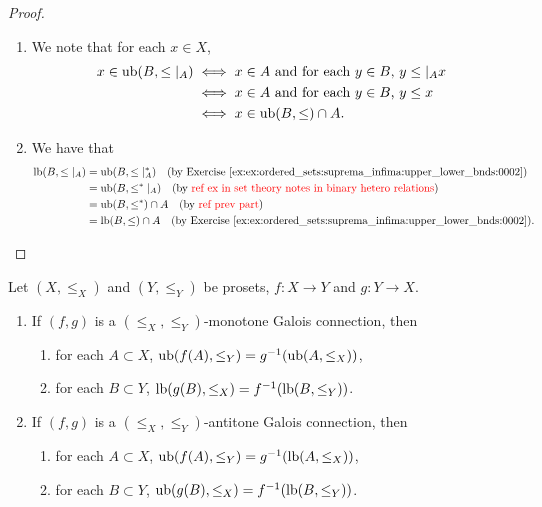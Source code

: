 \documentclass{book}
\begin{document}
	\begin{proof}\
		\begin{enumerate}
			\item 
			We note that for each $x \in X$,
			\begin{align*}
				x \in \operatorname{ub}(B, \leq|_A)
				& \iff \text{$x \in A$ and for each $y \in B$, $y \leq|_A x$} \\
				& \iff \text{$x \in A$ and for each $y \in B$, $y \leq x$} \\
				& \iff x \in \operatorname{ub}(B, \leq) \cap A.
			\end{align*}
			\item 
			We have that
			\begin{align*}
				\lbd(B, \leq|_A)
				& = \ubd(B, \leq|_A^*) \quad \text{(by \rex{ex:ordered_sets:suprema_infima:upper_lower_bnds:0002})} \\
				& = \ubd(B, \lop|_A) \quad \text{(by \tcr{ref ex in set theory notes in binary hetero relations})} \\
				& = \ubd(B, \lop) \cap A \quad \text{(by \tcr{ref prev part})} \\
				& = \lbd(B, \leq) \cap A \quad \text{(by \rex{ex:ordered_sets:suprema_infima:upper_lower_bnds:0002})}.
			\end{align*}
		\end{enumerate}
	\end{proof}
	
	
	\begin{ex} 
		Let $(X, \leq_X)$ and $(Y, \leq_Y)$ be prosets, $f: X \rightarrow Y$ and $g:Y \rightarrow X$. 
		\begin{enumerate}
			\item If $(f,g)$ is a $(\leq_X, \leq_Y)$-monotone Galois connection, then 
			\begin{enumerate}
				\item for each $A \subset X$, $\operatorname{ub}(f(A), \leq_Y) = g^{-1}(\operatorname{ub}(A, \leq_X))$,
				\item for each $B \subset Y$, $\operatorname{lb}(g(B), \leq_X) = f^{-1}(\operatorname{lb} (B, \leq_Y))$.
			\end{enumerate}
			\item If $(f,g)$ is a $(\leq_X, \leq_Y)$-antitone Galois connection, then 
			\begin{enumerate}
				\item for each $A \subset X$, $\operatorname{ub}(f(A), \leq_Y) = g^{-1}(\operatorname{lb} (A, \leq_X))$,
				\item for each $B \subset Y$, $\operatorname{ub}(g(B), \leq_X) = f^{-1}(\operatorname{lb} (B, \leq_Y))$.
			\end{enumerate}
		\end{enumerate} 
	\end{ex}
	
\end{document}
